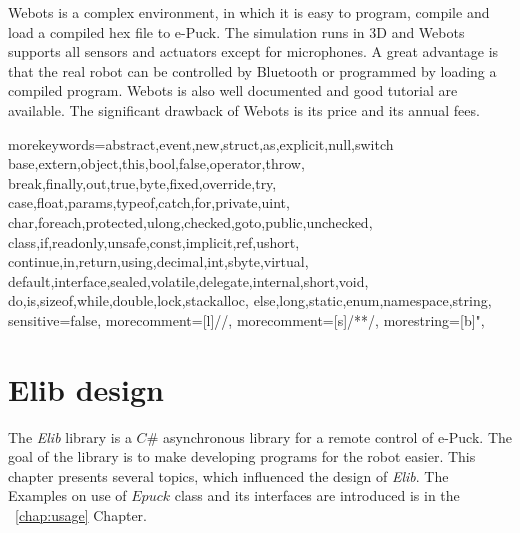 \documentclass[12pt,notitlepage]{report}
\begin{document}
	Webots is a complex environment, in which it is easy to program, compile and load 
	a compiled hex file to e-Puck.
	The simulation runs in 3D and Webots supports all sensors and actuators except for microphones.
	A great advantage is that the real robot can be controlled by Bluetooth or
	programmed by loading a compiled program.
	Webots is also well documented and good tutorial are available.
	The significant drawback of Webots is its price and its annual fees.
	
  {morekeywords={abstract,event,new,struct,as,explicit,null,switch
		base,extern,object,this,bool,false,operator,throw,
		break,finally,out,true,byte,fixed,override,try,
		case,float,params,typeof,catch,for,private,uint,
		char,foreach,protected,ulong,checked,goto,public,unchecked,
		class,if,readonly,unsafe,const,implicit,ref,ushort,
		continue,in,return,using,decimal,int,sbyte,virtual,
		default,interface,sealed,volatile,delegate,internal,short,void,
		do,is,sizeof,while,double,lock,stackalloc,
		else,long,static,enum,namespace,string},
	  sensitive=false,
	  morecomment=[l]{//},
	  morecomment=[s]{/*}{*/},
	  morestring=[b]",
}


\chapter{Elib design} \label{chap:elib}
	The {\it Elib} library is a $C\#$ asynchronous library for a remote control of e-Puck. 
	The goal of the library is to make developing programs for the robot easier.
	This chapter presents several topics, which influenced the design of {\it Elib}.
	The Examples on use of $Epuck$ class and its interfaces are introduced is in the ~\ref{chap:usage} Chapter.
\end{document}

